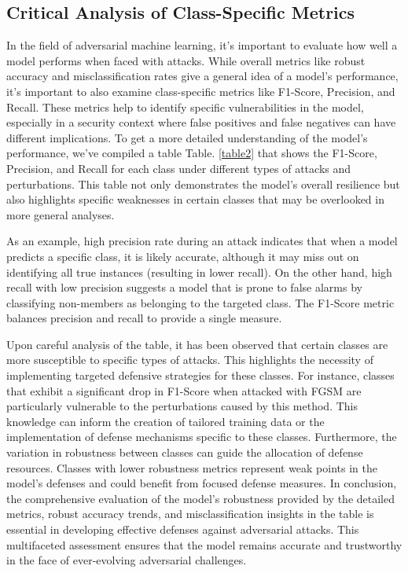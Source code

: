 \documentclass[10pt, conference, a4paper, final]{IEEEtran}
\begin{document}
\subsection{Critical Analysis of Class-Specific Metrics}

In the field of adversarial machine learning, it's important to evaluate how well a model performs when faced with attacks. While overall metrics like robust accuracy and misclassification rates give a general idea of a model's performance, it's important to also examine class-specific metrics like F1-Score, Precision, and Recall. These metrics help to identify specific vulnerabilities in the model, especially in a security context where false positives and false negatives can have different implications. To get a more detailed understanding of the model's performance, we've compiled a table Table. \ref{table2} that shows the F1-Score, Precision, and Recall for each class under different types of attacks and perturbations. This table not only demonstrates the model's overall resilience but also highlights specific weaknesses in certain classes that may be overlooked in more general analyses.

As an example, high precision rate during an attack indicates that when a model predicts a specific class, it is likely accurate, although it may miss out on identifying all true instances (resulting in lower recall). On the other hand, high recall with low precision suggests a model that is prone to false alarms by classifying non-members as belonging to the targeted class. The F1-Score metric balances precision and recall to provide a single measure.

Upon careful analysis of the table, it has been observed that certain classes are more susceptible to specific types of attacks. This highlights the necessity of implementing targeted defensive strategies for these classes. For instance, classes that exhibit a significant drop in F1-Score when attacked with FGSM are particularly vulnerable to the perturbations caused by this method. This knowledge can inform the creation of tailored training data or the implementation of defense mechanisms specific to these classes.
Furthermore, the variation in robustness between classes can guide the allocation of defense resources. Classes with lower robustness metrics represent weak points in the model's defenses and could benefit from focused defense measures.
In conclusion, the comprehensive evaluation of the model's robustness provided by the detailed metrics, robust accuracy trends, and misclassification insights in the table is essential in developing effective defenses against adversarial attacks. This multifaceted assessment ensures that the model remains accurate and trustworthy in the face of ever-evolving adversarial challenges.
\end{document}
